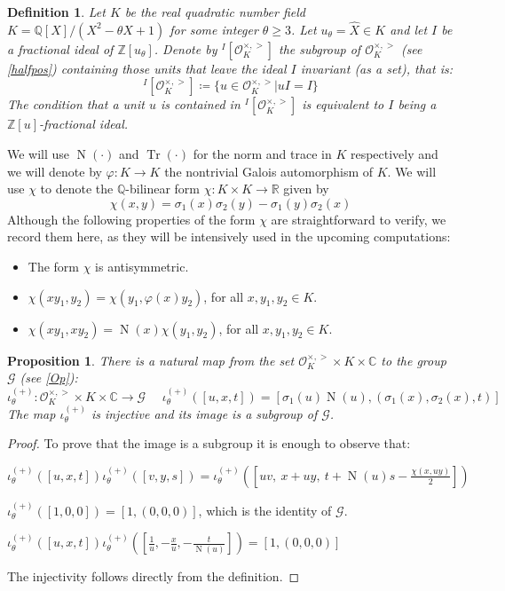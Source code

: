 \documentclass[12pt]{amsart}
\newtheorem{definition}{Definition}[section]
\newtheorem{proposition}{Proposition}[section]
\newcommand{\R}{\mathbb{R}}
\newcommand{\Z}{\mathbb{Z}}
\newcommand{\C}{\mathbb{C}}
\newcommand{\Q}{\mathbb{Q}}
\newcommand{\OO}{\mathcal{O}}
\DeclareMathOperator{\Norm}{N}
\DeclareMathOperator{\Trace}{Tr}
\begin{document}
\begin{definition}\label{msub}
Let $K$ be the real quadratic number field $K = \Q[X]/ (X^2-\theta X +1)$ for some integer $\theta \geq 3$. Let $u_\theta = \hat{X} \in K$ and let $I$ be a fractional ideal of $\Z[u_\theta]$. Denote by $ ^I[\OO_K^{\times,>}]$ the subgroup of $\OO_K^{\times,>}$ (see \ref{halfpos}) containing those units that leave the ideal $I$ invariant (as a set), that is:
$$^I[\OO_K^{\times,>}]\coloneqq \{u\in \OO_K^{\times,>}\vert uI=I\}$$
The condition that a unit $u$ is contained in $^I[\OO_K^{\times,>}]$ is equivalent to $I$ being a $\Z[u]$-fractional ideal.
\end{definition}
\noindent
We will use $\Norm (\cdot)$ and $\Trace(\cdot)$ for the norm and trace in $K$ respectively and we will denote by $\varphi : K \to K $  the nontrivial Galois automorphism of $K$. We will use $\chi$ to denote the $\Q$-bilinear form $\chi: K \times K \to \R$ given by 
\begin{equation}\label{chi}
\chi(x,y)= \sigma_1(x)\sigma_2(y)-\sigma_1(y)\sigma_2(x)
\end{equation}
\noindent
Although the following properties of the form $\chi$ are straightforward to verify, we record them here, as they will be intensively used in the upcoming computations:
\begin{itemize}
\item[$\bullet$] The form $\chi$ is antisymmetric.
\item[$\bullet$] $\chi(xy_1, y_2)= \chi(y_1, \varphi(x) y_2)$, for all $x,y_1,y_2 \in K$.
\item[$\bullet$] $\chi(xy_1, xy_2)= \Norm(x)\chi(y_1,y_2)$, for all $x,y_1,y_2 \in K.$
\end{itemize}
\begin{proposition}\label{emb1}
There is a natural map from the set $\OO_K^{\times, >} \times K \times \C$ to the group $\mathcal{G}$ (see \ref{Op}):
$$\iota_{\theta}^{(+)}: \OO_K^{\times, >} \times K \times \C \to \mathcal{G}\ \ \ \ \ \ \iota_{\theta}^{(+)}([u,x,t])=[\sigma_1(u)\Norm(u), (\sigma_1(x), \sigma_2(x),t)]$$
The map $\iota_{\theta}^{(+)}$ is injective and its image is a subgroup of $\mathcal{G}$.
\end{proposition}

\begin{proof}
To prove that the image is a subgroup it is enough to observe that:
\begin{casenv}

\item $\iota_{\theta}^{(+)}([u,x,t])\iota_{\theta}^{(+)}([v,y,s])=\iota_{\theta}^{(+)}\left(\left[uv,\ x+uy,\ t+\Norm(u)s - \frac{\chi(x,uy)}{2}\right]\right)$

\item $\iota_{\theta}^{(+)}([1,0,0])=[1,(0,0,0)]$,  which is the identity of $\mathcal{G}$.

\item $\iota_{\theta}^{(+)}([u,x,t])\iota_{\theta}^{(+)}\left(\left[\frac{1}{u}, -\frac{x}{u}, -\frac{t}{\Norm(u)}\right]\right)=[1,(0,0,0)]$
\end{casenv}
The injectivity follows directly from the definition.
\end{proof}
\end{document}
